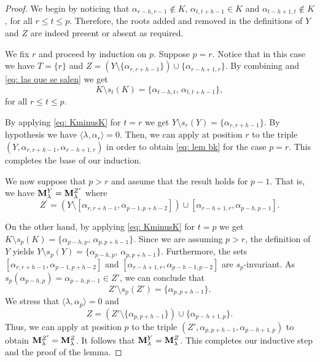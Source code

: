 \begin{proof}
We begin by noticing that  $\alpha_{r-h,r-1}\notin K$, $\alpha_{t,t+h-1}\in K$ and $\alpha_{t-h+1,t}\notin K$, for all $r\leq t \leq p$. 
Therefore, the roots added and removed in the definitions of $Y$ and $Z$ are indeed present or absent as required.

We fix $r$ and proceed by induction on $p $.
Suppose $p=r$.  Notice that in this case we have $T=\{r\}$ and $Z= (Y\setminus\{\alpha_{r,r+h-1} \}) \cup \{ \alpha_{r-h+1,r}\}$. 
By combining  and \eqref{eq: las que se salen} we get   
\begin{equation} \label{eq: KminusK}
    K\setminus s_t(K)=\{ \alpha_{t-h,t}, \, \alpha_{t,t+h-1} \},
\end{equation}
for all $r\leq t \leq p$.

By applying \eqref{eq: KminusK}  for $t=r$ we get $Y\setminus s_r(Y) =\{ \alpha_{r,r+h-1} \}$. 
By hypothesis we have $\langle \lambda  , \alpha_r \rangle =0$. 
Then, we can apply  at position $r$ to the triple $(Y, \alpha_{r,r+h-1}, \alpha_{r-h+1,r})$ in order to obtain \eqref{eq: lem bk} for the case $p=r$. 
This completes the base of our induction. 

 
We now suppose that $p>r $ and assume that the result holds for $p-1$. That is, we have  $\mathbf{M}_{\lambda}^{Y} = \mathbf{M}_{\lambda}^{Z^{\prime}}$ where
 \begin{equation}\label{eq: proof bk 2}
        Z^{\prime} = \left(Y\setminus [\alpha_{r,r+h-1},\alpha_{p-1,p+h-2}]\right) \cup [\alpha_{r-h+1,r},\alpha_{p-h,p-1}].
    \end{equation}
 

  On the other hand, by applying \eqref{eq: KminusK} for $t=p$  we get $K\setminus s_p(K) = \{  \alpha_{p-h,p}, \, \alpha_{p,p+h-1} \}$.
  Since we are assuming $p>r$, the definition of $Y$ yields $Y\setminus s_p(Y) = \{  \alpha_{p-h,p}, \, \alpha_{p,p+h-1} \}$.
  Furthermore, the sets $[\alpha_{r,r+h-1},\alpha_{p-1,p+h-2}]$ and $[\alpha_{r-h+1,r},\alpha_{p-h-1,p-2}]$ are $s_p$-invariant.
  As $s_p(\alpha_{p-h,p}) = \alpha_{p-h,p-1}\in Z' $, we can conclude that
  \begin{equation}\label{eq: Zprime}
      Z'\setminus s_p(Z') =\{ \alpha_{p,p+h-1}  \}.
  \end{equation}
 We stress  that $\langle \lambda , \alpha_p \rangle =0$ and 
 \begin{equation}
  Z= (Z'\setminus \{ \alpha_{p,p+h-1}  \}) \cup \{  \alpha_{p-h+1,p} \}. 
\end{equation}
Thus, we can apply  at position $p$ to the triple $(Z',\alpha_{p,p+h-1}, \alpha_{p-h+1,p})$ to obtain $\mathbf{M}_{\lambda}^{Z'} = \mathbf{M}_{\lambda}^{Z}$.
It follows that $\mathbf{M}_{\lambda}^{Y} = \mathbf{M}_{\lambda}^{Z}$. 
This completes our inductive step and the proof of the lemma.
\end{proof}



